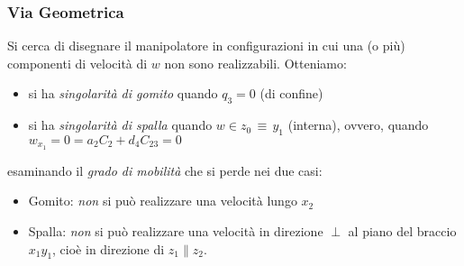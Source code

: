 \subsubsection{Via Geometrica}
Si cerca di disegnare il manipolatore in configurazioni in cui una (o più) componenti di velocità di $w$ non sono realizzabili. Otteniamo:
\begin{itemize}
	\item si ha \emph{singolarità di gomito} quando $q_3 = 0$ (di confine)
	\item si ha \emph{singolarità di spalla} quando $w\in z_0\,\equiv\,y_1$ (interna), ovvero, quando $w_{x_1} = 0 = a_2C_2 + d_4C_{23} = 0$
\end{itemize}

esaminando il \emph{grado di mobilità} che si perde nei due casi:
\begin{itemize}
	\item Gomito: \emph{non} si può realizzare una velocità lungo $x_2$
	\item Spalla: \emph{non} si può realizzare una velocità in direzione $\perp$ al piano del braccio $x_1y_1$, cioè in direzione di $z_1 \parallel z_2$.
\end{itemize}

